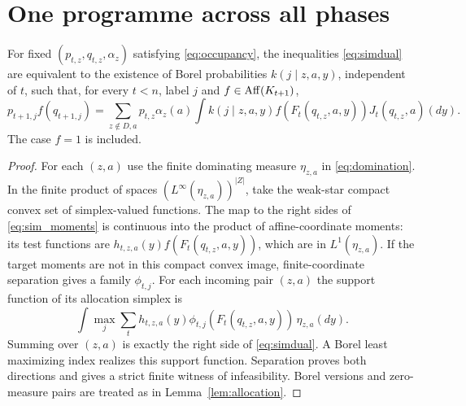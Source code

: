 \section{One programme across all phases}\label{sec:stationary}
\begin{lemma}\label{lem:simultaneous}
For fixed $(p_{t,z},q_{t,z},\alpha_z)$ satisfying \eqref{eq:occupancy}, the inequalities \eqref{eq:simdual} are equivalent to the existence of Borel probabilities $k(j\mid z,a,y)$, independent of $t$, such that, for every $t<n$, label $j$ and $f\in\operatorname{Aff}(K_{t+1})$,
\begin{equation}\label{eq:sim_moments}
 p_{t+1,j}f(q_{t+1,j})=
 \sum_{z\notin D,a}p_{t,z}\alpha_z(a)
 \int k(j\mid z,a,y)f(F_t(q_{t,z},a,y))J_t(q_{t,z},a)(dy).
\end{equation}
The case $f=1$ is included.
\end{lemma}
\begin{proof}
For each $(z,a)$ use the finite dominating measure $\eta_{z,a}$ in \eqref{eq:domination}. In the finite product of spaces $(L^\infty(\eta_{z,a}))^{|Z|}$, take the weak-star compact convex set of simplex-valued functions. The map to the right sides of \eqref{eq:sim_moments} is continuous into the product of affine-coordinate moments: its test functions are
$h_{t,z,a}(y)f(F_t(q_{t,z},a,y))$, which are in $L^1(\eta_{z,a})$. If the target moments are not in this compact convex image, finite-coordinate separation gives a family $\phi_{t,j}$. For each incoming pair $(z,a)$ the support function of its allocation simplex is
\[
 \int\max_j\sum_t h_{t,z,a}(y)\phi_{t,j}(F_t(q_{t,z},a,y))\,\eta_{z,a}(dy).
\]
Summing over $(z,a)$ is exactly the right side of \eqref{eq:simdual}. A Borel least maximizing index realizes this support function. Separation proves both directions and gives a strict finite witness of infeasibility. Borel versions and zero-measure pairs are treated as in Lemma~\ref{lem:allocation}.
\end{proof}

